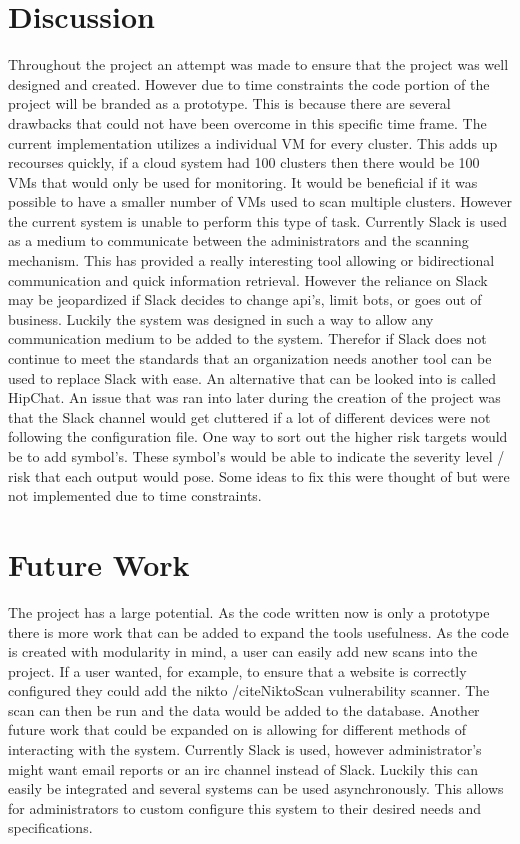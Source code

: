 \documentclass[12pt]{article}
\begin{document}
\section{Discussion}
Throughout the project an attempt was made to ensure that the project was well designed and created. However due to time constraints the code portion of the project will be branded as a prototype. This is because there are several drawbacks that could not have been overcome in this specific time frame. The current implementation utilizes a individual VM for every cluster. This adds up recourses quickly, if a cloud system had 100 clusters then there would be 100 VMs that would only be used for monitoring. It would be beneficial if it was possible to have a smaller number of VMs used to scan multiple clusters. However the current system is unable to perform this type of task. Currently Slack is used as a medium to communicate between the administrators and the scanning mechanism. This has provided a really interesting tool allowing or bidirectional communication and quick information retrieval. However the reliance on Slack may be jeopardized if Slack decides to change api's, limit bots, or goes out of business. Luckily the system was designed in such a way to allow any communication medium to be added to the system. Therefor if Slack does not continue to meet the standards that an organization needs another tool can be used to replace Slack with ease. An alternative that can be looked into is called HipChat.  An issue that was ran into later during the creation of the project was that the Slack channel would get cluttered if a lot of different devices were not following the configuration file. One way to sort out the higher risk targets would be to add symbol's. These symbol's would be able to indicate the severity level / risk that each output would pose. Some ideas to fix this were thought of but were not implemented due to time constraints.

\section{Future Work}
The project has a large potential. As the code written now is only a prototype there is more work that can be added to expand the tools usefulness. As the code is created with modularity in mind, a user can easily add new scans into the project. If a user wanted, for example, to ensure that a website is correctly configured they could add the nikto /cite{NiktoScan} vulnerability scanner. The scan can then be run and the data would be added to the database. Another future work that could be expanded on is allowing for different methods of interacting with the system. Currently Slack is used, however administrator's might want email reports or an irc channel instead of Slack. Luckily this can easily be integrated and several systems can be used asynchronously. This allows for administrators to custom configure this system to their desired needs and specifications.
\end{document}
